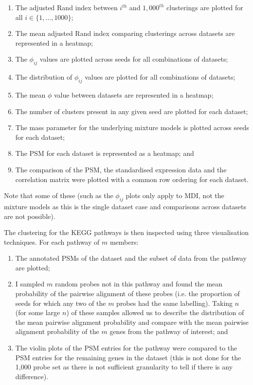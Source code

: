 \documentclass[12pt]{article} %
\begin{document}
	\begin{enumerate} \label{list:cedar_pipeline_analysis}
		\item The adjusted Rand index between $i^{th}$ and $1,000^{th}$ clusterings are plotted for all $i\in \{1,\ldots,1000\}$;
		\item The mean adjusted Rand index comparing clusterings across datasets are represented in a heatmap;
		\item The $\phi_{ij}$ values are plotted across seeds for all combinations of datasets;
		\item The distribution of $\phi_{ij}$ values are plotted for all combinations of datasets;
		\item The mean $\phi$ value between datasets are represented in a heatmap;
		\item The number of clusters present in any given seed are plotted for each dataset;
		\item The mass parameter for the underlying mixture models is plotted across seeds for each dataset;
		\item The PSM for each dataset is represented as a heatmap; and
		\item The comparison of the PSM, the standardised expression data and the correlation matrix were plotted with a common row ordering for each dataset. %
	\end{enumerate}
	Note that some of these (such as the $\phi_{ij}$ plots only apply to MDI, not the mixture models as this is the single dataset case and comparisons across datasets are not possible).
	
	The clustering for the KEGG pathways is then inspected using three visualisation techniques. For each pathway of $m$ members:
	\begin{enumerate}
		\item The annotated PSMs of the dataset and the subset of data from the pathway are plotted;
		\item I sampled $m$ random probes not in this pathway and found the mean probability of the pairwise alignment of these probes (i.e. the proportion of seeds for which any two of the $m$ probes had the same labelling). Taking $n$ (for some large $n$) of these samples allowed us to describe the distribution of the mean pairwise alignment probability and compare with the mean pairwise alignment probability of the $m$ genes from the pathway of interest; and
		\item The violin plots of the PSM entries for the pathway were compared to the PSM entries for the remaining genes in the dataset (this is not done for the 1,000 probe set as there is not sufficient granularity to tell if there is any difference).
	\end{enumerate}
\end{document}
